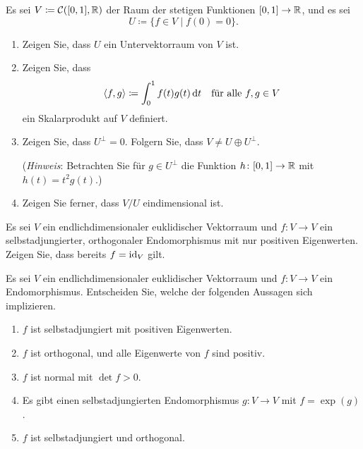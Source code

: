 \documentclass[a4paper,10pt]{scrartcl}
\begin{document}
\begin{question}
  Es sei $V \coloneqq \mathcal{C}([0,1], \mathbb{R})$ der Raum der stetigen Funktionen $[0,1] \to \mathbb{R}$, und es sei
  \[
    U \coloneqq \{ f \in V \mid f(0) = 0 \}.
  \]
  \begin{enumerate}[leftmargin=*]
    \item
      Zeigen Sie, dass $U$ ein Untervektorraum von $V$ ist.
    \item
      Zeigen Sie, dass
      \[
        \langle f, g \rangle \coloneqq \int_0^1 f(t) g(t) \,\text{d}t
        \quad
        \text{für alle $f, g \in V$}
      \]
      ein Skalarprodukt auf $V$ definiert.
    \item
      Zeigen Sie, dass $U^\perp = 0$.
      Folgern Sie, dass $V \neq U \oplus U^\perp$.
      
      (\emph{Hinweis}:
       Betrachten Sie für $g \in U^\perp$ die Funktion $h \colon [0,1] \to \mathbb{R}$ mit $h(t) = t^2 g(t)$.)
    \item
      Zeigen Sie ferner, dass $V\!/U$ eindimensional ist.
  \end{enumerate}
\end{question}


\begin{question}
  Es sei $V$ ein endlichdimensionaler euklidischer Vektorraum und $f \colon V \to V$ ein selbstadjungierter, orthogonaler Endomorphismus mit nur positiven Eigenwerten.
  Zeigen Sie, dass bereits $f = \operatorname{id}_V$ gilt.
\end{question}


\begin{question}
  Es sei $V$ ein endlichdimensionaler euklidischer Vektorraum und $f \colon V \to V$ ein Endomorphismus.
  Entscheiden Sie, welche der folgenden Aussagen sich implizieren.
  \begin{enumerate}
    \item
      $f$ ist selbstadjungiert mit positiven Eigenwerten.
    \item
      $f$ ist orthogonal, und alle Eigenwerte von $f$ sind positiv.
    \item
      $f$ ist normal mit $\det f > 0$.
    \item
      Es gibt einen selbstadjungierten Endomorphismus $g \colon V \to V$ mit $f = \exp(g)$.
    \item
      $f$ ist selbstadjungiert und orthogonal.
  \end{enumerate}
\end{question}
\end{document}
